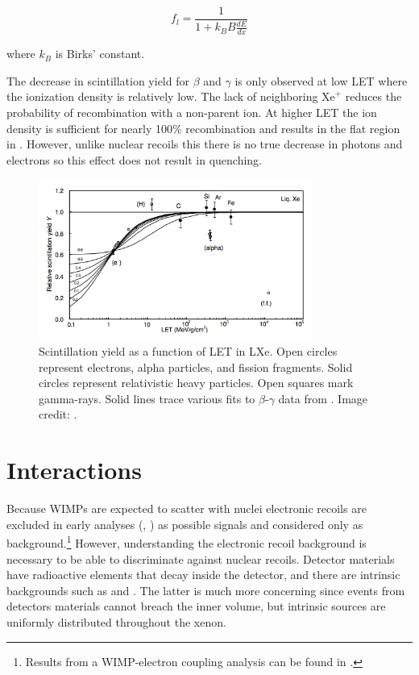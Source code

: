 \begin{equation}
f_{l} = \frac{1}{1 + k_B B \frac{dE}{dx}}
\label{eq:nr_scint_quench}
\end{equation}

\noindent where $k_B$ is Birks' constant.

The decrease in scintillation yield for $\beta$ and $\gamma$ is only observed at low LET where the ionization density is relatively
low.  The
lack of neighboring $\mathrm{Xe}^{+}$ reduces the probability of recombination with a non-parent ion.  At higher LET the ion density
is sufficient for nearly 100\% recombination and results in the flat region in .  However, unlike nuclear
recoils this there is no true decrease in photons and electrons so this effect does not result in quenching.

\begin{figure}
\includegraphics[width=0.8\textwidth]{ScintillationYield}
\caption{Scintillation yield as a function of LET in LXe.  Open circles represent electrons, alpha particles, and fission
fragments.  Solid circles represent relativistic heavy particles.  Open squares mark gamma-rays.  Solid lines trace various fits
to $\beta$-$\gamma$ data from .  Image credit: .}
\label{fig:scintillation_yield}
\end{figure}



\section{Interactions}
\label{sec:interactions}
Because WIMPs are expected to scatter with nuclei electronic recoils are excluded in early analyses (,
) as possible signals and considered only as background.\footnote{Results from a WIMP-electron coupling analysis can
be found in .}  However, understanding the electronic recoil background is necessary to be able to discriminate
against nuclear recoils.  Detector materials have radioactive elements that decay inside the detector, and there are intrinsic
backgrounds such as \krypton and \radon.  The latter is much more concerning since events from
detectors materials cannot breach the inner volume, but intrinsic sources are uniformly distributed throughout the xenon.

